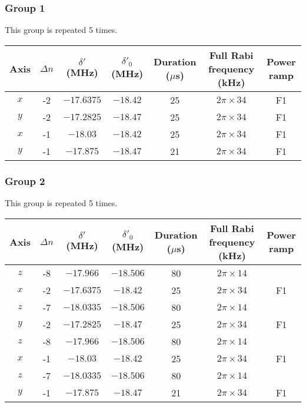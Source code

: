 \documentclass[aps,secnumarabic,amsmath,amssymb]{revtex4}
\begin{document}
\subsubsection{Group 1}
This group is repeated 5 times.
\begin{center}
  \begin{tabular}{|c|c|c|c|c|c|c|}
    \hline
    Axis&$\Delta n$&$\delta'$ (MHz)&$\delta'_0$ (MHz)&Duration ($\mu$s)&Full Rabi frequency (kHz)&Power ramp\\\hline
    $x$&-2&$-17.6375$&$-18.42$&25&$2\pi\times34$&F1\\\hline
    $y$&-2&$-17.2825$&$-18.47$&25&$2\pi\times34$&F1\\\hline
    $x$&-1&$-18.03$&$-18.42$&25&$2\pi\times34$&F1\\\hline
    $y$&-1&$-17.875$&$-18.47$&21&$2\pi\times34$&F1\\\hline
  \end{tabular}
\end{center}
\subsubsection{Group 2}
This group is repeated 5 times.
\begin{center}
  \begin{tabular}{|c|c|c|c|c|c|c|}
    \hline
    Axis&$\Delta n$&$\delta'$ (MHz)&$\delta'_0$ (MHz)&Duration ($\mu$s)&Full Rabi frequency (kHz)&Power ramp\\\hline
    $z$&-8&$-17.966$&$-18.506$&80&$2\pi\times14$&\\\hline
    $x$&-2&$-17.6375$&$-18.42$&25&$2\pi\times34$&F1\\\hline
    $z$&-7&$-18.0335$&$-18.506$&80&$2\pi\times14$&\\\hline
    $y$&-2&$-17.2825$&$-18.47$&25&$2\pi\times34$&F1\\\hline
    $z$&-8&$-17.966$&$-18.506$&80&$2\pi\times14$&\\\hline
    $x$&-1&$-18.03$&$-18.42$&25&$2\pi\times34$&F1\\\hline
    $z$&-7&$-18.0335$&$-18.506$&80&$2\pi\times14$&\\\hline
    $y$&-1&$-17.875$&$-18.47$&21&$2\pi\times34$&F1\\\hline
  \end{tabular}
\end{center}
\end{document}
